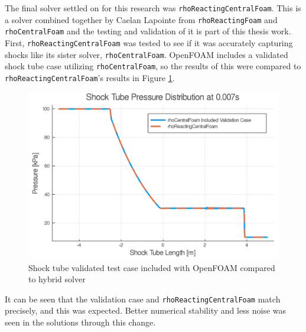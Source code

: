 The final solver settled on for this research was \verb|rhoReactingCentralFoam|. This is a solver combined together by Caelan Lapointe from \verb|rhoReactingFoam| and \verb|rhoCentralFoam| and the testing and validation of it is part of this thesis work. First, \verb|rhoReactingCentralFoam| was tested to see if it was accurately capturing shocks like its sister solver, \verb|rhoCentralFoam|. OpenFOAM includes a validated shock tube case utilizing \verb|rhoCentralFoam|, so the results of this were compared to \verb|rhoReactingCentralFoam|'s results in Figure \ref{fig:sod}. 
\begin{figure}[]
\centering
\includegraphics[width=0.85\linewidth]{./figs/shocktube.png} 
\caption{Shock tube validated test case included with OpenFOAM compared to hybrid solver}
\label{fig:sod}
\end{figure}%
\noindent It can be seen that the validation case and \verb|rhoReactingCentralFoam| match precisely, and this was expected. Better numerical stability and less noise was seen in the solutions through this change. 
